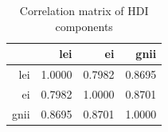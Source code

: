\begin{table}[ht]
\centering
\begin{tabular}{rrrr}
  \toprule
 & lei & ei & gnii \\
  \midrule
lei & 1.0000 & 0.7982 & 0.8695 \\
  ei & 0.7982 & 1.0000 & 0.8701 \\
  gnii & 0.8695 & 0.8701 & 1.0000 \\
   \bottomrule
\end{tabular}
\caption{Correlation matrix of HDI components}
\label{tab:corr_choquet}
\end{table}
